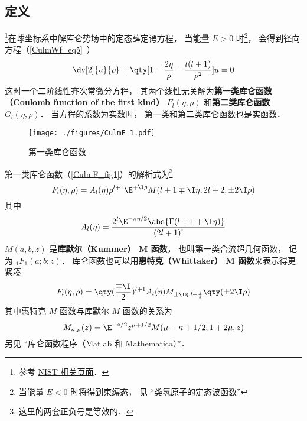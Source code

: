 

\subsection{定义}
\footnote{参考 \href{https://dlmf.nist.gov/33.2}{NIST 相关页面}．}在球坐标系中解库仑势场中的定态薛定谔方程， 当能量 $E > 0$ 时\footnote{当能量 $E < 0$ 时将得到束缚态， 见 “类氢原子的定态波函数”}， 会得到径向方程（\autoref{CulmWf_eq5}~）
\begin{equation}
\dv[2]{u}{\rho} + \qty[1 - \frac{2\eta}{\rho} - \frac{l(l+1)}{\rho^2}]u = 0
\end{equation}
这时一个二阶线性齐次常微分方程， 其两个线性无关解为\textbf{第一类库仑函数（Coulomb function of the first kind）} $F_l(\eta, \rho)$ 和\textbf{第二类库仑函数} $G_l(\eta, \rho)$． 当方程的系数为实数时， 第一类和第二类库仑函数也是实函数．

\begin{figure}[ht]
\centering
\texttt{[image: ./figures/CulmF\_1.pdf]}
\caption{第一类库仑函数} \label{CulmF_fig1}
\end{figure}

第一类库仑函数（\autoref{CulmF_fig1}）的解析式为\footnote{这里的两套正负号是等效的．}
\begin{equation}
F_l(\eta, \rho) = A_l(\eta) \rho^{l+1} \E^{\mp\I\rho} M(l+1\mp\I\eta, 2l+2, \pm 2\I\rho)
\end{equation}
其中
\begin{equation}
A_l(\eta) = \frac{2^l \E^{-\pi\eta/2} \abs{\Gamma(l+1+\I\eta)}}{(2l+1)!}
\end{equation}
$M(a, b, z)$ 是\textbf{库默尔（Kummer） M 函数}， 也叫第一类合流超几何函数， 记为 $_1 F_1(a;b;z)$． 库仑函数也可以用\textbf{惠特克（Whittaker） M 函数}来表示得更紧凑
\begin{equation}
F_l(\eta, \rho) = \qty(\frac{\mp\I}{2})^{l+1} A_l(\eta) M_{\pm\I\eta, l+\frac12}\qty(\pm 2\I\rho)
\end{equation}
其中惠特克 $M$ 函数与库默尔 $M$ 函数的关系为
\begin{equation}
M_{\kappa, \mu}(z) = \E^{-z/2} z^{\mu + 1/2} M(\mu - \kappa + 1/2, 1 + 2\mu, z)
\end{equation}
另见 “库仑函数程序（Matlab 和 Mathematica）”．

